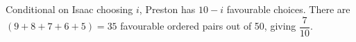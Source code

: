 Conditional on Isaac choosing $i$, Preston has $10-i$ favourable choices. There are $(9+8+7+6+5)=35$ favourable ordered pairs out of 50, giving $\boxed{\dfrac{7}{10}}$.
